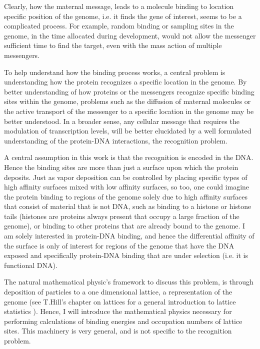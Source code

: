   Clearly, how the maternal message, leads to a molecule binding to location specific position of the genome, i.e. it finds the gene of interest, seems to be a complicated process.  For example, random binding or sampling sites in the genome, in the time allocated during development, would not allow the messenger sufficient time to find the target, even with the mass action of multiple messengers.  
  
  To help understand how the binding process works, a central problem is understanding how the protein recognizes a specific location in the genome.  By better understanding of how proteins or the messengers recognize specific binding sites within the genome, problems such as the diffusion of maternal molecules or the active transport of the messenger to a specific location in the genome may be better understood.  In a broader sense, any cellular message that requires the modulation of transcription levels, will be better elucidated by a well formulated understanding of the protein-DNA interactions, the recognition problem.
   
   A central assumption in this work is that the recognition is encoded in the DNA.  Hence the binding sites are more than just a surface upon which the protein deposits.  Just as vapor deposition can be controlled by placing specific types of high affinity surfaces mixed with low affinity surfaces, so too, one could imagine the protein binding to regions of the genome solely due to high affinity surfaces that consist of material that is not DNA, such as binding to a histone or histone tails (histones are proteins always present that occupy a large fraction of the genome), or binding to other proteins that are already bound to the genome.  I am solely interested in protein-DNA binding, and hence the differential affinity of the surface is only of interest for regions of the genome that have the DNA exposed and specifically protein-DNA binding that are under selection (i.e. it is functional DNA).  
   
   The natural mathematical physic's framework to discuss this problem, is through deposition of particles to a one dimensional lattice, a representation of the genome (see T.Hill's chapter on lattices for a general introduction to lattice statistics \cite{hill1986introduction}).  Hence, I will introduce the mathematical physics necessary for performing calculations of binding energies and occupation numbers of lattice sites.  This machinery is very general, and is not specific to the recognition problem.  

